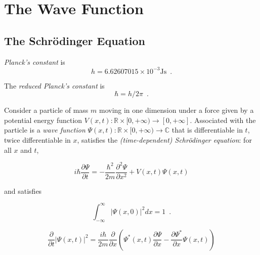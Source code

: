 \chapter{The Wave Function}

\section{The Schr\"{o}dinger Equation}

\begin{df}
\emph{Planck's constant} is
\[ h = 6.62607015 \times 10^{-3} \mathrm{Js} \enspace . \]
\end{df}

\begin{df}
The \emph{reduced Planck's constant} is
\[ \hbar = h / 2 \pi \enspace . \]
\end{df}

Consider a particle of mass $m$ moving in one dimension under a force given by a potential energy function $V(x,t) : \mathbb{R} \times [0,+\infty) \rightarrow [0, + \infty]$. Associated with the particle is a \emph{wave function} $\Psi(x,t) : \mathbb{R} \times [0,+\infty) \rightarrow \mathbb{C}$ that is differentiable in $t$, twice differentiable in $x$, satisfies the \emph{(time-dependent) Schr\"{o}dinger equation}: for all $x$ and $t$,

\[ i \hbar \frac{\partial \Psi}{\partial t} = - \frac{\hbar^2}{2 m} \frac{\partial^2 \Psi}{\partial x^2} + V(x,t) \Psi(x,t) \]

and satisfies

\[ \int_{- \infty}^\infty |\Psi(x,0)|^2 dx = 1 \enspace . \]

\begin{prop}
\label{prop:differentiate_psi_squared}
\[ \frac{\partial}{\partial t} |\Psi(x,t)|^2 = \frac{i \hbar}{2m} \frac{\partial}{\partial x} \left(
\Psi^*(x,t) \frac{\partial \Psi}{\partial x} - \frac{\partial \Psi^*}{\partial x} \Psi(x,t) \right) \]
\end{prop}

